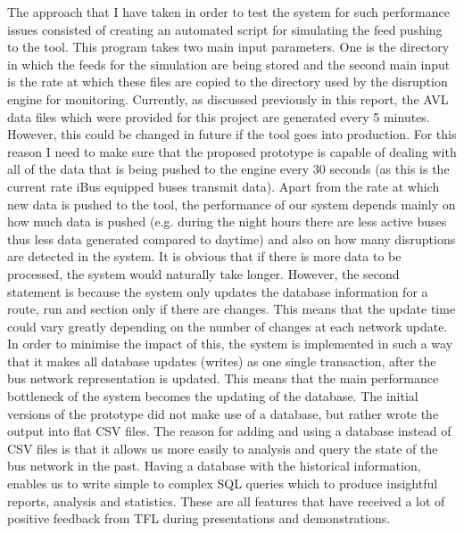The approach that I have taken in order to test the system for such performance issues consisted of creating an automated script for simulating the feed pushing to the tool. This program takes two main input parameters. One is the directory in which the feeds for the simulation are being stored and the second main input is the rate at which these files are copied to the directory used by the disruption engine for monitoring. Currently, as discussed previously in this report, the AVL data files which were provided for this project are generated every 5 minutes. However, this could be changed in future if the tool goes into production. For this reason I need to make sure that the proposed prototype is capable of dealing with all of the data that is being pushed to the engine every 30 seconds (as this is the current rate iBus equipped buses transmit data). Apart from the rate at which new data is pushed to the tool, the performance of our system depends mainly on how much data is pushed (e.g. during the night hours there are less active buses thus less data generated compared to daytime) and also on how many disruptions are detected in the system. It is obvious that if there is more data to be processed, the system would naturally take longer. However, the second statement is because the system only updates the database information for a route, run and section only if there are changes. This means that the update time could vary greatly depending on the number of changes at each network update. In order to minimise the impact of this, the system is implemented in such a way that it makes all database updates (writes) as one single transaction, after the bus network representation is updated. This means that the main performance bottleneck of the system becomes the updating of the database. The initial versions of the prototype did not make use of a database, but rather wrote the output into flat CSV files. The reason for adding and using a database instead of CSV files is that it allows us more easily to analysis and query the state of the bus network in the past. Having a database with the historical information, enables us to write simple to complex SQL queries which to produce insightful reports, analysis and statistics. These are all features that have received a lot of positive feedback from TFL during presentations and demonstrations.

